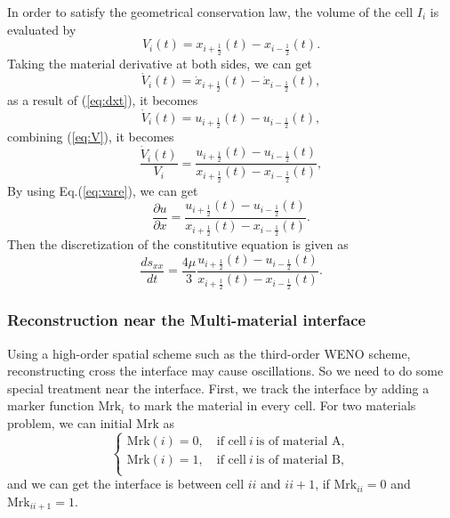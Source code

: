 \documentclass{article}
\numberwithin{equation}{section}
\numberwithin{table}{section}
\begin{document}
In order to satisfy the geometrical conservation law, the volume of the cell $I_i$ is evaluated by
\begin{equation}\label{eq:V}
  V_i(t) = x_{i+\frac{1}{2}}(t) - x_{i-\frac{1}{2}}(t).
\end{equation}
Taking the material derivative at both sides, we can get
\begin{equation}\label{eq:dotV}
  \dot{V}_i(t) = \dot{x}_{i+\frac{1}{2}}(t) - \dot{x}_{i-\frac{1}{2}}(t),
\end{equation}
as a result of (\ref{eq:dxt}), it becomes
\begin{equation}\label{eq:dotV}
  \dot{V}_i(t) = u_{i+\frac{1}{2}}(t) - u_{i-\frac{1}{2}}(t),
\end{equation}
combining (\ref{eq:V}), it becomes
\begin{equation}
  \frac{\dot{V}_i(t)}{V_i} =\frac{ u_{i+\frac{1}{2}}(t) - u_{i-\frac{1}{2}}(t)}{ x_{i+\frac{1}{2}}(t) - x_{i-\frac{1}{2}}(t)},
\end{equation}
By using Eq.(\ref{eq:vare}), we can get
\begin{equation}
  \frac{\partial u}{\partial x} =\frac{ u_{i+\frac{1}{2}}(t) - u_{i-\frac{1}{2}}(t)}{ x_{i+\frac{1}{2}}(t) - x_{i-\frac{1}{2}}(t)}.
\end{equation}
Then  the  discretization of the constitutive equation is given as
\begin{equation}\label{eq:semSxx}
  \frac{d s_{xx}}{dt } =\frac{4\mu}{3} \frac{ u_{i+\frac{1}{2}}(t) - u_{i-\frac{1}{2}}(t)}{ x_{i+\frac{1}{2}}(t) - x_{i-\frac{1}{2}}(t)}.
\end{equation}


\subsubsection{Reconstruction near the Multi-material interface}

Using a high-order spatial scheme  such as the third-order WENO scheme,  reconstructing  cross the interface may cause oscillations. So we need to do some special treatment near the interface.  First, we track the interface  by adding  a marker function $\text{Mrk}_i$  to mark the material in every cell. For two materials problem, we can initial $\text{Mrk}$ as 
\begin{equation}
  \left\{
  \begin{aligned}
	\text{Mrk}(i) = 0 ,\quad \text{if cell} \ i \ \text{is of  material A}, \\
	\text{Mrk}(i) = 1 ,\quad \text{if cell} \ i \ \text{is  of material B}, \\
\end{aligned}
\right.
\end{equation}
and we can get the interface is between cell $ii$ and $ii+1$,  if $\text{Mrk}_{ii} = 0$ and   $\text{Mrk}_{ii+1} = 1$.
\end{document}

